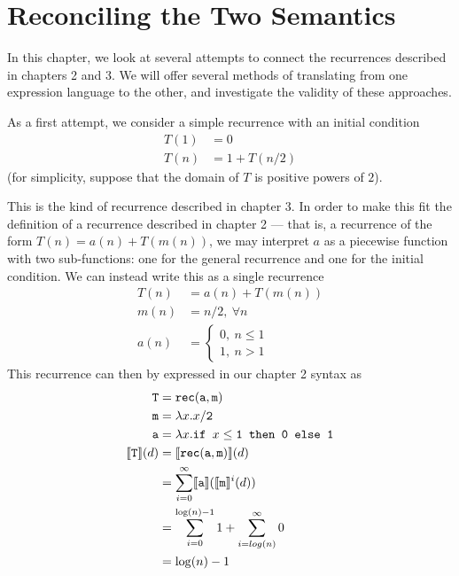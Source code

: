 \chapter{Reconciling the Two Semantics}
In this chapter, we look at several attempts to connect the recurrences described in chapters 2 and 3. We will offer
several methods of translating from one expression language to the other, and investigate the validity of these approaches.

As a first attempt, we consider a simple recurrence with an initial condition
\begin{align*}
T(1) &= 0 \\
T(n) &= 1 + T(n/2 ) 
\end{align*}
(for simplicity, suppose that the domain of $T$ is positive powers of $2$).

This is the kind of recurrence described in chapter 3. In order to make this fit the definition of a recurrence described in 
chapter 2 --- that is, a recurrence of the form $T(n) = a(n) + T(m(n))$, we may interpret $a$ as a 
piecewise function with two sub-functions: one for the general recurrence and one for the initial condition.
We can instead write this as a single recurrence
\begin{align*}
T(n) &= a(n) + T(m(n)) \\
m(n) &= n/2, \ \forall n \\ 
a(n) &=
\begin{cases} 
0, \ n \leq 1 \\
1, \ n > 1
\end{cases}
\end{align*} 
This recurrence can then by expressed in our chapter 2 syntax as 
\begin{align*}
\texttt{T} &= \texttt{rec}(\texttt{a},\texttt{m}) \\
\texttt{m} &= \lambda x.x/\texttt{2} \\
\texttt{a} &= \lambda x.\texttt{if } x\leq\texttt{1} \texttt{ then } \texttt{0} \texttt{ else } \texttt{1} \\
\llbracket \texttt{T} \rrbracket(d) &= \llbracket \texttt{rec}(\texttt{a},\texttt{m}) \rrbracket(d) \\
&= \sum_{i=0}^{\infty}\llbracket \texttt{a} \rrbracket(\llbracket \texttt{m}\rrbracket^i(d)) \\
&= \sum_{i=0}^{\log(n)-1} 1 + \sum_{i=log(n)}^{\infty} 0 \\
&= \log(n) - 1
\end{align*}

